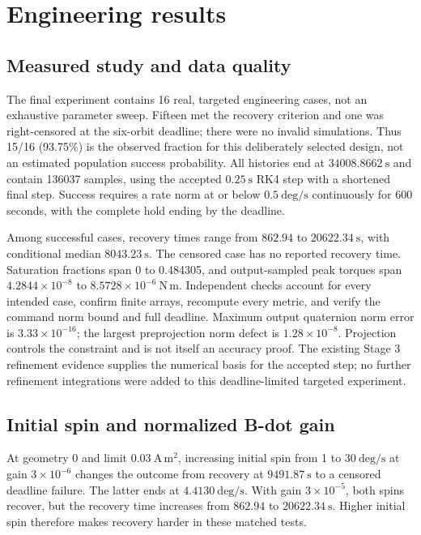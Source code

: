 \section{Engineering results}
\subsection{Measured study and data quality}
The final experiment contains 16 real, targeted engineering cases, not an
exhaustive parameter sweep. Fifteen met the recovery criterion and one was
right-censored at the six-orbit deadline; there were no invalid simulations.
Thus 15/16 (93.75\%) is the observed fraction for this deliberately selected
design, not an estimated population success probability. All histories end
at $34008.8662\ \mathrm{s}$ and contain 136037 samples, using the accepted
$0.25\ \mathrm{s}$ RK4 step with a shortened final step.
Success requires a rate norm at or below $0.5\ \mathrm{deg/s}$ continuously
for 600 seconds, with the complete hold ending by the deadline.

Among successful cases, recovery times range from $862.94$ to
$20622.34\ \mathrm{s}$, with conditional median $8043.23\ \mathrm{s}$.
The censored case has no reported recovery time. Saturation fractions span
0 to 0.484305, and output-sampled peak torques span
$4.2844\times10^{-8}$ to $8.5728\times10^{-6}\ \mathrm{N\,m}$.
Independent checks account for every intended case, confirm finite arrays,
recompute every metric, and verify the command norm bound and full deadline.
Maximum output quaternion norm error is $3.33\times10^{-16}$;
the largest preprojection norm defect is $1.28\times10^{-8}$.
Projection controls the constraint and is not itself an accuracy proof.
The existing Stage 3 refinement evidence supplies the numerical basis for
the accepted step; no further refinement integrations were added to this
deadline-limited targeted experiment.

\begin{table}[htbp]
\centering\small
\resizebox{\linewidth}{!}{}
\caption{All 16 measured real cases. Spin is in deg/s, gain in
kg\,m$^2$/s, and dipole limit in A\,m$^2$. Recovery is the start of a complete
qualifying 600-second hold. ``Censored'' means no such hold was completed
before the deadline. Saturation is time weighted over the full trajectory.}
\label{tab:targeted-results}
\end{table}

\subsection{Initial spin and normalized B-dot gain}
At geometry 0 and limit $0.03\ \mathrm{A\,m^2}$, increasing initial spin
from 1 to $30\ \mathrm{deg/s}$ at gain $3\times10^{-6}$ changes the outcome
from recovery at $9491.87\ \mathrm{s}$ to a censored deadline failure.
The latter ends at $4.4130\ \mathrm{deg/s}$. With gain
$3\times10^{-5}$, both spins recover, but the recovery time increases
from $862.94$ to $20622.34\ \mathrm{s}$. Higher initial spin therefore makes
recovery harder in these matched tests.

